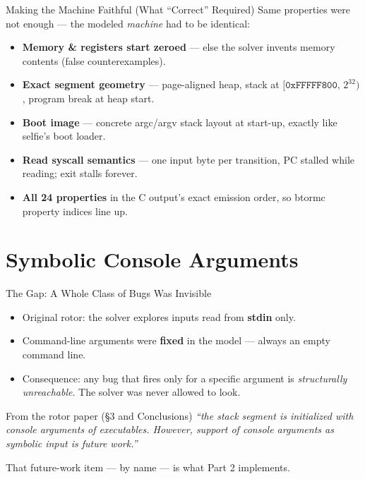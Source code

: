 \documentclass[aspectratio=169]{beamer}
\newcommand{\keylab}[1]{\textbf{\color{blue!55!black}#1}}
\begin{document}
\begin{frame}{Making the Machine Faithful (What ``Correct'' Required)}
  Same properties were not enough --- the modeled \emph{machine}
  had to be identical:
  \begin{itemize}\setlength\itemsep{0.3em}
    \item \keylab{Memory \& registers start zeroed} --- else the
          solver invents memory contents (false counterexamples).
    \item \keylab{Exact segment geometry} --- page-aligned heap,
          stack at $[\texttt{0xFFFFF800},\,2^{32})$, program break
          at heap start.
    \item \keylab{Boot image} --- concrete argc/argv stack layout at
          start-up, exactly like selfie's boot loader.
    \item \keylab{Read syscall semantics} --- one input byte per
          transition, PC stalled while reading; exit stalls forever.
    \item \keylab{All 24 properties} in the C output's exact emission
          order, so btormc property indices line up.
  \end{itemize}
\end{frame}

\part{Symbolic Console Arguments}
\begin{frame}
  \partpage
\end{frame}

\begin{frame}{The Gap: A Whole Class of Bugs Was Invisible}
  \begin{itemize}\setlength\itemsep{0.4em}
    \item Original rotor: the solver explores inputs read from
          \keylab{stdin} only.
    \item Command-line arguments were \keylab{fixed} in the model ---
          always an empty command line.
    \item Consequence: any bug that fires only for a specific argument
          is \emph{structurally unreachable}. The solver was never
          allowed to look.
  \end{itemize}
  \vspace{0.25cm}
  \begin{block}{From the rotor paper (\S 3 and Conclusions)}
    \itshape ``the stack segment is initialized with console arguments
    of executables. However, support of console arguments as symbolic
    input is future work.''
  \end{block}
  \vspace{0.1cm}
  \centering\small That future-work item --- by name --- is what Part 2
  implements.
\end{frame}
\end{document}
